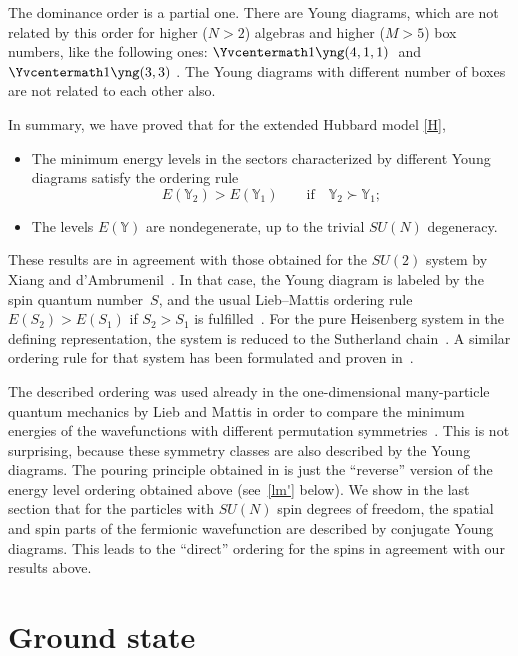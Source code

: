 \documentclass[pdftex]{sigma}
\newcommand{\yn}{\mathbb{Y}}
\newcommand{\yc}{\Yvcentermath1}
\begin{document}
The dominance order is a partial one. There are Young diagrams, which are
not related by this order for higher ($N>2$) algebras and higher ($M>5$) box numbers,
like the following ones:
{\tiny $\yc \yng(4,1,1)\;$} and {\tiny $\yc \yng(3,3)\;$}.
The  Young diagrams with dif\/ferent number of boxes are not related to each other also.


In summary, we have proved that for the extended Hubbard model \eqref{H},
\begin{itemize}\itemsep=0pt
\item
The minimum energy levels in the sectors characterized by dif\/ferent
Young diagrams satisfy the ordering rule
\begin{equation}
\label{lm}
E(\yn_2)>E(\yn_1)\qquad \text{if} \quad \yn_2\succ \yn_1;
\end{equation}
\item
The levels $E(\yn)$ are nondegenerate, up to the trivial $SU(N)$ degeneracy.
\end{itemize}


These results are in agreement with those obtained for the $SU(2)$ system by Xiang
and d'Ambrumenil~\cite{Amb92-2}. In that case, the  Young diagram is labeled by
the spin quantum number~$S$, and  the usual Lieb--Mattis ordering rule
$E(S_2)>E(S_1)$ if $S_2> S_1$  is fulf\/illed~\cite{LM62}.
For the pure Heisenberg system in the def\/ining representation, the system is reduced
to the Sutherland chain~\cite{Suth}. A similar ordering rule
for that system has been formulated and proven in~\cite{H04}.


The described ordering was used  already in the one-dimensional
many-particle quantum mechanics by Lieb and Mattis in order to compare
the minimum energies of the  wavefunctions with dif\/ferent
permutation symmetries~\cite{LM62'}.
This is not surprising, because these symmetry classes are also described by the Young diagrams.
The pouring principle obtained in \cite{LM62'} is just the ``reverse'' version of the
energy level ordering obtained above (see~\eqref{lm'} below).
We show in the last section that  for the particles with $SU(N)$ spin degrees of freedom,
the spatial and spin parts of the fermionic wavefunction
are described by conjugate Young diagrams. This leads to the ``direct'' ordering
for the spins in agreement with our results above.


\section{Ground state}\label{section6}
\end{document}
